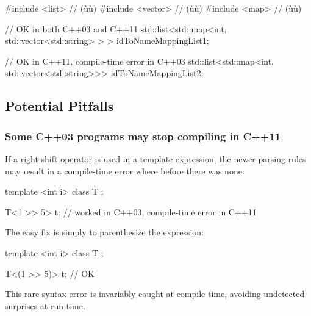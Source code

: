 \begin{emcppshiddenlisting}[emcppsbatch=e3]
#include <list>    // (ù{}ù)
#include <vector>  // (ù{}ù)
#include <map>     // (ù{}ù)
\end{emcppshiddenlisting}
\begin{emcppslisting}[emcppsbatch=e3]
// OK in both C++03 and C++11
std::list<std::map<int, std::vector<std::string> > > idToNameMappingList1;

// OK in C++11, compile-time error in C++03
std::list<std::map<int, std::vector<std::string>>>   idToNameMappingList2;
\end{emcppslisting}


\subsection[Potential Pitfalls]{Potential Pitfalls}\label{potential-pitfalls}

\subsubsection[Some C++03 programs may stop compiling in C++11]{Some C++03 programs may stop compiling in C++11}\label{some-c++03-programs-may-stop-working-in-c++11}

If a right-shift operator is used in a template expression, the newer
parsing rules may result in a compile-time error where before there was
none:

\begin{emcppshiddenlisting}[emcppsbatch=ped1,emcppsstandards=c++03]
template <int i> class T {};
\end{emcppshiddenlisting}
\begin{emcppslisting}[emcppsbatch=ped1]
T<1 >> 5> t;  // worked in C++03, compile-time error in C++11
\end{emcppslisting}

\noindent The easy fix is simply to parenthesize the expression:

\begin{emcppshiddenlisting}[emcppsbatch=ped2,emcppsstandards={c++11,c++14}]
template <int i> class T {};
\end{emcppshiddenlisting}
\begin{emcppslisting}[emcppsbatch=ped2]
T<(1 >> 5)> t;  // OK
\end{emcppslisting}

\noindent This rare syntax error is invariably caught at compile time, avoiding undetected surprises at run time.

